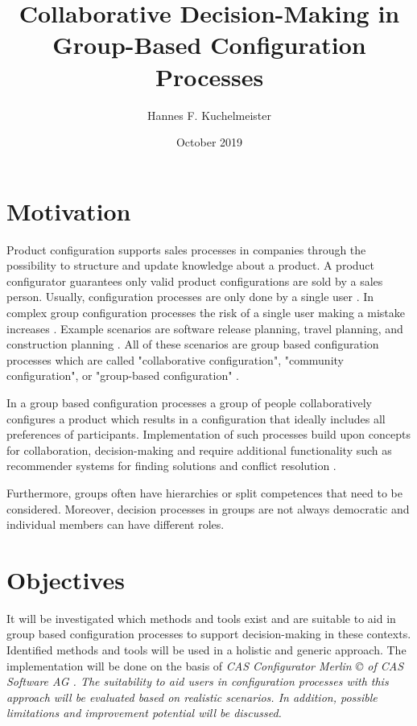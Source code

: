 \documentclass{article}
\title{Collaborative Decision-Making in Group-Based Configuration Processes}
\author{Hannes F. Kuchelmeister}
\date{October 2019}
\begin{document}
\maketitle

\section{Motivation}

Product configuration supports sales processes in companies through the possibility to structure and update knowledge about a product. A product configurator guarantees only valid product configurations are sold by a sales person. Usually, configuration processes are only done by a single user \cite{felferningGroupBasedConfiguration2016, velasquez-guevaraMultiSPLOTSupportingMultiuser2018a}.
In complex group configuration processes the risk of a single user making a mistake increases \cite{felfernigGroupDecisionSupport2011}.
Example scenarios are software release planning, travel planning, and construction planning \cite{felfernigOpenConfiguration2014}. 
All of these scenarios are group based configuration processes which are called "collaborative configuration", "community configuration", or "group-based configuration" \cite{felferningGroupBasedConfiguration2016, felfernigOpenConfiguration2014,mendoncaCollaborativeProductConfiguration2008,felfernigKnowledgebasedConfigurationResearch2014}.

In a group based configuration processes a group of people collaboratively configures a product which results in a configuration that ideally includes all preferences of participants. Implementation of such processes build upon concepts for collaboration, decision-making and require additional functionality such as recommender systems for finding solutions and conflict resolution \cite{felfernigKnowledgebasedConfigurationResearch2014}.


Furthermore, groups often have hierarchies or split competences that need to be considered. Moreover, decision processes in groups are not always democratic and individual members can have different roles.

\section{Objectives}

It will be investigated which methods and tools exist and are suitable to aid in group based configuration processes to support decision-making in these contexts. Identified methods and tools will be used in a holistic and generic approach. 
The implementation will be done on the basis of \it{ CAS Configurator Merlin \copyright } of \it{ CAS Software AG }. The suitability to aid users in configuration processes with this approach will be evaluated based on realistic scenarios. In addition, possible limitations and improvement potential will be discussed.
\end{document}
